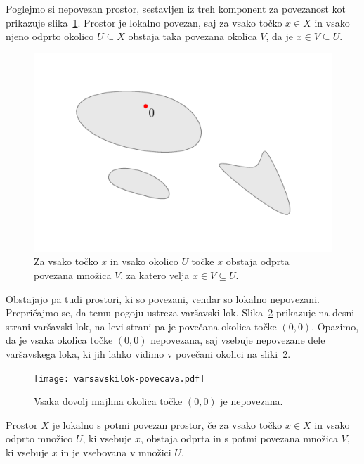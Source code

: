 \documentclass[../TG_magistrsko_delo_sections.tex]{subfiles}
\begin{document}
\begin{primer}
Poglejmo si nepovezan prostor, sestavljen iz treh komponent za povezanost kot prikazuje slika~\ref{fig:nepov-lokpov}. Prostor je lokalno povezan, saj za vsako točko $x \in X$ in vsako njeno odprto okolico $U\subseteq X$ obstaja taka povezana okolica $V$, da je $x \in V \subseteq U$.
\begin{figure}[h]
  \centering
  \includegraphics{nepov-lokpov.pdf}
  \caption[Primer vektorske slike.]{Za vsako točko $x$ in vsako okolico $U$ točke $x$ obstaja odprta povezana množica $V$, za katero velja $x \in V \subseteq U$.}
  \label{fig:nepov-lokpov}
\end{figure}
\end{primer}

Obstajajo pa tudi prostori, ki so povezani, vendar so lokalno nepovezani. Prepričajmo se, da temu pogoju ustreza varšavski lok. Slika~\ref{fig:vl-lok-nepovezan} prikazuje na desni strani varšavski lok, na levi strani pa je povečana okolica točke $(0, 0)$. Opazimo, da je vsaka okolica točke $(0, 0)$ nepovezana, saj vsebuje nepovezane dele varšavskega loka, ki jih lahko vidimo v povečani okolici na sliki~\ref{fig:vl-lok-nepovezan}.

\begin{figure}[h]
  \centering
  \texttt{[image: varsavskilok-povecava.pdf]}
  \caption[Primer vektorske slike.]{Vsaka dovolj majhna okolica točke $(0, 0)$ je nepovezana.}
  \label{fig:vl-lok-nepovezan}
\end{figure}

\begin{definicija}
Prostor $X$ je lokalno s potmi povezan prostor, če za vsako točko $ x\in X$ in vsako odprto množico $U$, ki vsebuje $x$, obstaja odprta in s potmi povezana množica $V$, ki vsebuje $x$ in je vsebovana v množici $U$.
\end{definicija}
\end{document}
